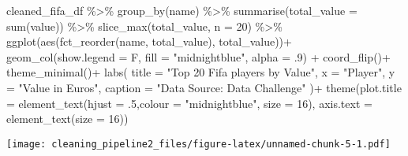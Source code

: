 \documentclass[
]{article}
\newenvironment{Shaded}{\begin{snugshade}}{\end{snugshade}}
\newcommand{\AttributeTok}[1]{\textcolor[rgb]{0.77,0.63,0.00}{#1}}
\newcommand{\DecValTok}[1]{\textcolor[rgb]{0.00,0.00,0.81}{#1}}
\newcommand{\FunctionTok}[1]{\textcolor[rgb]{0.00,0.00,0.00}{#1}}
\newcommand{\NormalTok}[1]{#1}
\newcommand{\SpecialCharTok}[1]{\textcolor[rgb]{0.00,0.00,0.00}{#1}}
\newcommand{\StringTok}[1]{\textcolor[rgb]{0.31,0.60,0.02}{#1}}
\begin{document}
\begin{Shaded}
\begin{Highlighting}[]
\NormalTok{cleaned\_fifa\_df }\SpecialCharTok{\%\textgreater{}\%} 
  \FunctionTok{group\_by}\NormalTok{(name) }\SpecialCharTok{\%\textgreater{}\%} 
  \FunctionTok{summarise}\NormalTok{(}\AttributeTok{total\_value =} \FunctionTok{sum}\NormalTok{(value)) }\SpecialCharTok{\%\textgreater{}\%} 
  \FunctionTok{slice\_max}\NormalTok{(total\_value, }\AttributeTok{n =} \DecValTok{20}\NormalTok{) }\SpecialCharTok{\%\textgreater{}\%} 
  \FunctionTok{ggplot}\NormalTok{(}\FunctionTok{aes}\NormalTok{(}\FunctionTok{fct\_reorder}\NormalTok{(name, total\_value), total\_value))}\SpecialCharTok{+}
  \FunctionTok{geom\_col}\NormalTok{(}\AttributeTok{show.legend =}\NormalTok{ F, }\AttributeTok{fill =} \StringTok{"midnightblue"}\NormalTok{, }\AttributeTok{alpha =}\NormalTok{ .}\DecValTok{9}\NormalTok{) }\SpecialCharTok{+}
  \FunctionTok{coord\_flip}\NormalTok{()}\SpecialCharTok{+}
  \FunctionTok{theme\_minimal}\NormalTok{()}\SpecialCharTok{+}
  \FunctionTok{labs}\NormalTok{(}
    \AttributeTok{title =} \StringTok{"Top 20 Fifa players by Value"}\NormalTok{,}
    \AttributeTok{x =} \StringTok{"Player"}\NormalTok{, }
    \AttributeTok{y =} \StringTok{"Value in Euros"}\NormalTok{,}
    \AttributeTok{caption =} \StringTok{"Data Source: Data Challenge"}
\NormalTok{  )}\SpecialCharTok{+}
  \FunctionTok{theme}\NormalTok{(}\AttributeTok{plot.title =} \FunctionTok{element\_text}\NormalTok{(}\AttributeTok{hjust =}\NormalTok{ .}\DecValTok{5}\NormalTok{,}\AttributeTok{colour =} \StringTok{"midnightblue"}\NormalTok{, }\AttributeTok{size =} \DecValTok{16}\NormalTok{),}
        \AttributeTok{axis.text =} \FunctionTok{element\_text}\NormalTok{(}\AttributeTok{size =} \DecValTok{16}\NormalTok{)) }
\end{Highlighting}
\end{Shaded}

\texttt{[image: cleaning\_pipeline2\_files/figure-latex/unnamed-chunk-5-1.pdf]}
\end{document}
